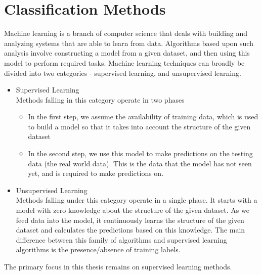 \chapter{Classification Methods}
\label{chapter:Classification Methods}

Machine learning is a branch of computer science that deals with building and analyzing systems that are able to learn from data. Algorithms based upon such analysis involve constructing a model from a given dataset, and then using this model to perform required tasks. Machine learning techniques can broadly be divided into two categories - supervised learning, and unsupervised learning.
\begin{itemize}
    \item{
    Supervised Learning\\
    Methods falling in this category operate in two phases
    \begin{itemize}
        \item{In the first step, we assume the availability of training data, which is used to build a model so that it takes into account the structure of the given dataset}
        \item{In the second step, we use this model to make predictions on the testing data (the real world data). This is the data that the model has not seen yet, and is required to make predictions on.}
    \end{itemize}
    }
    \item{
    Unsupervised Learning\\
    Methods falling under this category operate in a single phase. It starts with a model with zero knowledge about the structure of the given dataset. As we feed data into the model, it continuously learns the structure of the given dataset and calculates the predictions based on this knowledge. The main difference between this family of algorithms and supervised learning algorithms is the presence/absence of training labels.
    }
\end{itemize}
The primary focus in this thesis remains on supervised learning methods.

